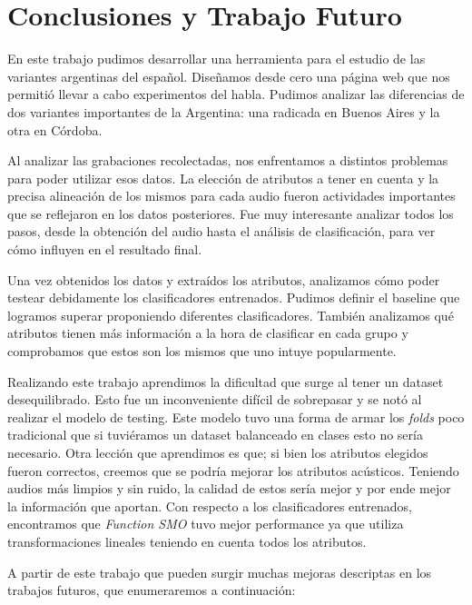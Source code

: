 \chapter{Conclusiones y Trabajo Futuro}

En este trabajo pudimos desarrollar una herramienta para el estudio de las variantes argentinas del español. Diseñamos desde cero una página web que nos permitió llevar a cabo experimentos del habla. Pudimos analizar las diferencias de dos variantes importantes de la Argentina: una radicada en Buenos Aires y la otra en Córdoba. 

Al analizar las grabaciones recolectadas, nos enfrentamos a distintos problemas para poder utilizar esos datos. La elección de atributos a tener en cuenta y la precisa alineación de los mismos para cada audio fueron actividades importantes que se reflejaron en los datos posteriores. Fue muy interesante analizar todos los pasos, desde la obtención del audio hasta el análisis de clasificación, para ver cómo influyen en el resultado final.

Una vez obtenidos los datos y extraídos los atributos, analizamos cómo poder testear debidamente los clasificadores entrenados. Pudimos definir el baseline que logramos superar proponiendo diferentes clasificadores. También analizamos qué atributos tienen más información a la hora de clasificar en cada grupo y comprobamos que estos son los mismos que uno intuye popularmente.

Realizando este trabajo aprendimos la dificultad que surge al tener un dataset desequilibrado. Esto fue un inconveniente difícil de sobrepasar y se notó al realizar el modelo de testing. Este modelo tuvo una forma de armar los \textit{folds} poco tradicional que si tuviéramos un dataset balanceado en clases esto no sería necesario. Otra lección que aprendimos es que; si bien los atributos elegidos fueron correctos, creemos que se podría mejorar los atributos acústicos. Teniendo audios más limpios y sin ruido, la calidad de estos sería mejor y por ende mejor la información que aportan. Con respecto a los clasificadores entrenados, encontramos que \textit{Function SMO} tuvo mejor performance ya que utiliza transformaciones lineales teniendo en cuenta todos los atributos.

A partir de este trabajo que pueden surgir muchas mejoras descriptas en los trabajos futuros, que enumeraremos a continuación:

